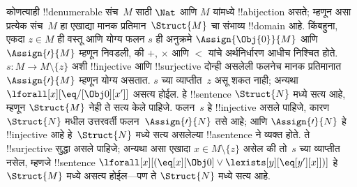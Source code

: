 \documentclass[../../../include/open-logic-section]{subfiles}
\begin{document}
\begin{explain}
कोणत्याही !!{denumerable} संच~$M$ साठी $\Nat$ आणि $M$ यांमध्ये
!!a{bijection} असते; म्हणून असा प्रत्येक संच~$M$ हा एखाद्या मानक
प्रतिमान~$\Struct{M}$ चा संभाव्य !!{domain} आहे. किंबहुना, एकदा $z \in M$
ही वस्तू आणि योग्य फलन $s$ ही अनुक्रमे $\Assign{\Obj{0}}{M}$ आणि
$\Assign{\prime}{M}$ म्हणून निवडली, की $+$, $\times$ आणि $<$ यांचे
अर्थनिर्धारण आधीच निश्चित होते. $s\colon M \to M \setminus \{z\}$ अशी
!!{injective} आणि !!{surjective} दोन्ही असलेली फलनेच मानक प्रतिमानात
$\Assign{\prime}{M}$ म्हणून योग्य असतात. $s$ च्या व्याप्तीत~$z$ असू शकत
नाही; अन्यथा $\lforall[x][\eq/[\Obj 0][x']]$ असत्य होईल. हे !!{sentence}
$\Struct{N}$ मध्ये सत्य आहे, म्हणून $\Struct{M}$ नेही ते सत्य केले पाहिजे.
फलन~$s$ हे !!{injective} असले पाहिजे, कारण $\Struct{N}$ मधील उत्तरवर्ती
फलन~$\Assign{\prime}{N}$ तसे आहे; आणि $\Assign{\prime}{N}$ हे
!!{injective} आहे हे~$\Struct{N}$ मध्ये सत्य असलेल्या !!a{sentence} ने
व्यक्त होते. ते !!{surjective} सुद्धा असले पाहिजे; अन्यथा असा एखादा
$x \in M \setminus \{z\}$ असेल की तो~$s$ च्या व्याप्तीत नसेल, म्हणजे
!!{sentence} $\lforall[x][(\eq[x][\Obj 0] \lor
\lexists[y][\eq[y'][x]])]$ हे~$\Struct{M}$ मध्ये असत्य होईल---पण ते
$\Struct{N}$ मध्ये सत्य आहे.
\end{explain}
\end{document}
